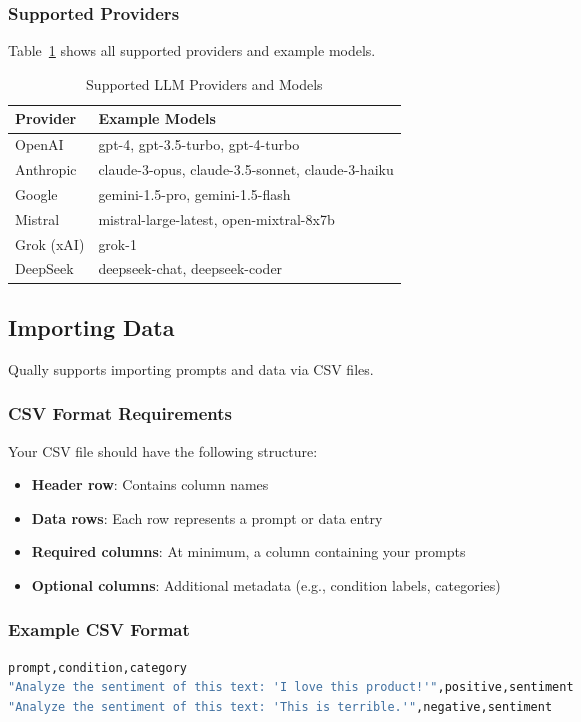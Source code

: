 \documentclass[11pt,a4paper]{article}
\begin{document}
\subsubsection{Supported Providers}
Table~\ref{tab:providers} shows all supported providers and example models.

\begin{table}[ht]
\centering
\begin{tabular}{ll}
\toprule
Provider & Example Models \\
\midrule
OpenAI & gpt-4, gpt-3.5-turbo, gpt-4-turbo \\
Anthropic & claude-3-opus, claude-3.5-sonnet, claude-3-haiku \\
Google & gemini-1.5-pro, gemini-1.5-flash \\
Mistral & mistral-large-latest, open-mixtral-8x7b \\
Grok (xAI) & grok-1 \\
DeepSeek & deepseek-chat, deepseek-coder \\
\bottomrule
\end{tabular}
\caption{Supported LLM Providers and Models}
\label{tab:providers}
\end{table}

\subsection{Importing Data}
Qually supports importing prompts and data via CSV files.

\subsubsection{CSV Format Requirements}
Your CSV file should have the following structure:
\begin{itemize}
    \item \textbf{Header row}: Contains column names
    \item \textbf{Data rows}: Each row represents a prompt or data entry
    \item \textbf{Required columns}: At minimum, a column containing your prompts
    \item \textbf{Optional columns}: Additional metadata (e.g., condition labels, categories)
\end{itemize}

\subsubsection{Example CSV Format}
\begin{lstlisting}[language=bash]
prompt,condition,category
"Analyze the sentiment of this text: 'I love this product!'",positive,sentiment
"Analyze the sentiment of this text: 'This is terrible.'",negative,sentiment
\end{lstlisting}
\end{document}
